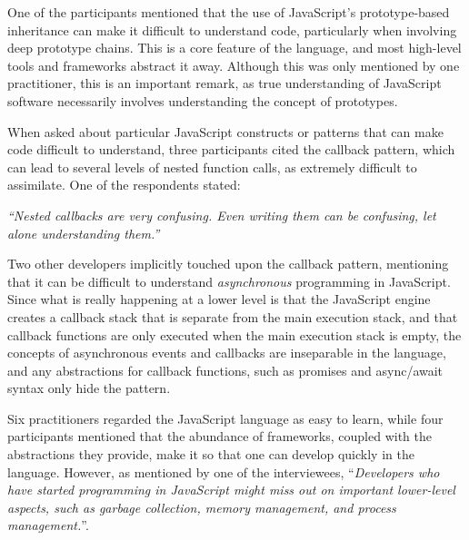 One of the participants mentioned that the use of JavaScript's prototype-based inheritance can make it difficult to understand code, particularly when involving  deep prototype chains. This is a core feature of the language, and most high-level tools and frameworks abstract it away. Although this was only mentioned by one practitioner, this is an important remark, as true understanding of JavaScript software necessarily involves understanding the concept of prototypes.

When asked about particular JavaScript constructs or patterns that can make code difficult to understand, three participants cited the callback pattern, which can lead to several levels of nested function calls, as extremely difficult to assimilate. One of the respondents stated:

\begin{mq}
\emph{``Nested callbacks are very confusing. Even writing them can be confusing, let alone understanding them.''}
\end{mq}

Two other developers implicitly touched upon the callback pattern, mentioning that it can be difficult to understand \emph{asynchronous} programming in JavaScript. Since what is really happening at a lower level is that the JavaScript engine creates a callback stack that is separate from the main execution stack, and that callback functions are only executed when the main execution stack is empty, the concepts of asynchronous events and callbacks are inseparable in the language, and any abstractions for callback functions, such as promises and async/await syntax only hide the pattern.



Six practitioners regarded the JavaScript language as easy to learn, while four
participants mentioned that the abundance of frameworks,
coupled with the abstractions they provide, make it so that one
can develop quickly in the language. However, as mentioned by one
of the interviewees, ``\emph{Developers who have started
programming in JavaScript might miss out on important lower-level
aspects, such as garbage collection, memory management,
and process management.}''. 

